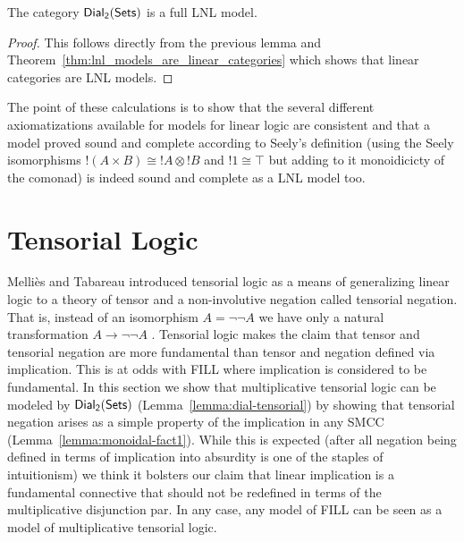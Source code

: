 \begin{corollary}
  \label{corollary:dial-FLNL}
  The category $\mathsf{Dial_2}(\mathsf{Sets})$ is a full LNL model.
\end{corollary}
\begin{proof}
  This follows directly from the previous lemma and
  Theorem~\ref{thm:lnl_models_are_linear_categories} which shows that
  linear categories are LNL models.
\end{proof}


The point of these calculations is to show that the several different
axiomatizations available for models for linear logic are consistent
and that a model proved sound and complete according to Seely's
definition (using the Seely isomorphisms $!(A \times B)\cong !A\otimes
!B$ and $!1\cong \top$ but adding to it monoidicicty of the comonad)
is indeed sound and complete as a LNL model too.

\section{Tensorial Logic}
\label{sec:tensor_logic}

Melli\`es and Tabareau introduced tensorial logic as a means of
generalizing linear logic to a theory of tensor and a non-involutive
negation called tensorial negation.  That is, instead of an
isomorphism $A = \lnot\lnot A$ we have only a natural transformation
$A \to \lnot\lnot A$ \cite{Mellies:2008}.  Tensorial logic makes the
claim that tensor and tensorial negation are more fundamental than
tensor and negation defined via implication.  This is at odds with
FILL where implication is considered to be fundamental.  In this
section we show that multiplicative tensorial logic can be modeled by
$\mathsf{Dial_2}(\mathsf{Sets})$ (Lemma~\ref{lemma:dial-tensorial}) by showing that tensorial
negation arises as a simple property of the implication in any SMCC
(Lemma~\ref{lemma:monoidal-fact1}).  While this is expected (after all
negation being defined in terms of implication into absurdity is one
of the staples of intuitionism) we think it bolsters our claim that
linear implication is a fundamental connective that should not be
redefined in terms of the multiplicative disjunction par.  In any
case, any model of FILL can be seen as a model of multiplicative
tensorial logic.  

